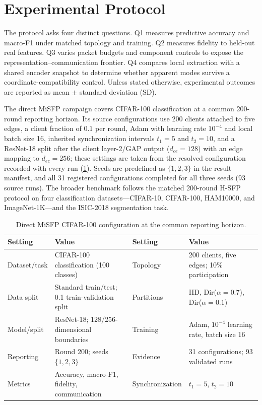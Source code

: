 \section{Experimental Protocol}\label{sec:experiments}
The protocol asks four distinct questions. Q1 measures predictive accuracy and macro-F1 under matched topology and training. Q2 measures fidelity to held-out real features. Q3 varies packet budgets and component controls to expose the representation--communication frontier. Q4 compares local extraction with a shared encoder snapshot to determine whether apparent modes survive a coordinate-compatibility control. Unless stated otherwise, experimental outcomes are reported as mean $\pm$ standard deviation (SD).

The direct MiSFP campaign covers CIFAR-100 classification at a common 200-round reporting horizon. Its source configurations use 200 clients attached to five edges, a client fraction of $0.1$ per round, Adam with learning rate $10^{-4}$ and local batch size 16, inherited synchronization intervals $t_1=5$ and $t_2=10$, and a ResNet-18 split after the client layer-2/GAP output ($d_{ce}=128$) with an edge mapping to $d_{ec}=256$; these settings are taken from the resolved configuration recorded with every run (\cref{tab:setup}). Seeds are predefined as $\{1,2,3\}$ in the result manifest, and all 31 registered configurations completed for all three seeds (93 source runs). The broader benchmark follows the matched 200-round H-SFP protocol on four classification datasets---CIFAR-10, CIFAR-100, HAM10000, and ImageNet-1K---and the ISIC-2018 segmentation task.

\begin{table}[t]
\caption{Direct MiSFP CIFAR-100 configuration at the common reporting horizon.}
\label{tab:setup}
\centering\footnotesize
\begin{tabularx}{\textwidth}{@{}lXlX@{}}\toprule
Setting & Value & Setting & Value\\\midrule
Dataset/task & CIFAR-100 classification (100 classes) & Topology & 200 clients, five edges; 10\% participation\\
Data split & Standard train/test; 0.1 train-validation split & Partitions & IID, Dir($\alpha{=}0.7$), Dir($\alpha{=}0.1$)\\
Model/split & ResNet-18; 128/256-dimensional boundaries & Training & Adam, $10^{-4}$ learning rate, batch size 16\\
Reporting & Round 200; seeds $\{1,2,3\}$ & Evidence & 31 configurations; 93 validated runs\\
Metrics & Accuracy, macro-F1, fidelity, communication & Synchronization & $t_1=5$, $t_2=10$\\
\bottomrule\end{tabularx}
\end{table}

